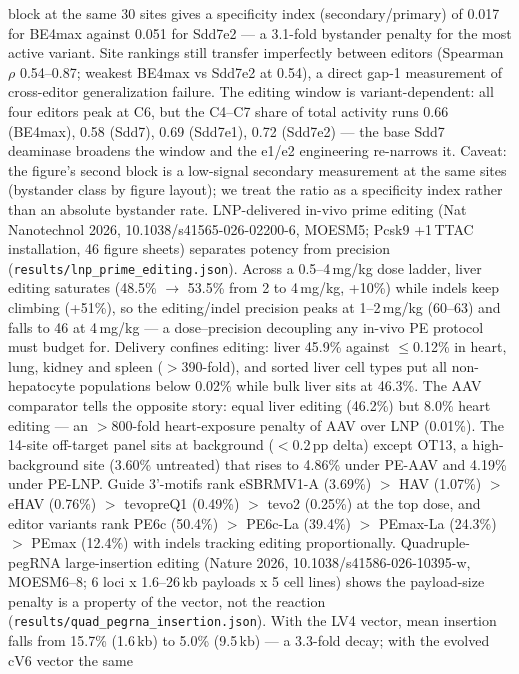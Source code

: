 \documentclass[12pt]{article}
\begin{document}
block at the same 30 sites gives a specificity index
(secondary/primary) of 0.017 for BE4max against 0.051 for Sdd7e2 ---
a 3.1-fold bystander penalty for the most active variant.
Site rankings still transfer imperfectly between editors (Spearman
$\rho$ 0.54--0.87; weakest BE4max vs Sdd7e2 at 0.54), a direct gap-1
measurement of cross-editor generalization failure. The editing window
is variant-dependent: all four editors peak at C6, but the C4--C7 share
of total activity runs 0.66 (BE4max), 0.58 (Sdd7), 0.69 (Sdd7e1),
0.72 (Sdd7e2) --- the base Sdd7 deaminase broadens the window and the
e1/e2 engineering re-narrows it. Caveat: the figure's second block is
a low-signal secondary measurement at the same sites (bystander class
by figure layout); we treat the ratio as a specificity index rather
than an absolute bystander rate.
LNP-delivered in-vivo prime editing (Nat Nanotechnol 2026,
10.1038/s41565-026-02200-6, MOESM5; Pcsk9 +1\,TTAC installation, 46
figure sheets) separates potency from precision
(\texttt{results/lnp\_prime\_editing.json}). Across a
0.5--4\,mg/kg dose ladder, liver editing saturates (48.5\% $\to$
53.5\% from 2 to 4\,mg/kg, +10\%) while indels keep climbing
(+51\%), so the editing/indel precision peaks at 1--2\,mg/kg (60--63)
and falls to 46 at 4\,mg/kg --- a dose--precision decoupling any
in-vivo PE protocol must budget for. Delivery confines editing:
liver 45.9\% against $\leq$0.12\% in heart, lung, kidney and spleen
($>$390-fold), and sorted liver cell types put all non-hepatocyte
populations below 0.02\% while bulk liver sits at 46.3\%. The AAV
comparator tells the opposite story: equal liver editing (46.2\%) but
8.0\% heart editing --- an $>$800-fold heart-exposure penalty of AAV
over LNP (0.01\%). The 14-site off-target panel sits at background
($<$0.2\,pp delta) except OT13, a high-background site (3.60\%
untreated) that rises to 4.86\% under PE-AAV and 4.19\% under PE-LNP.
Guide 3'-motifs rank eSBRMV1-A (3.69\%) $>$ HAV (1.07\%) $>$
eHAV (0.76\%) $>$ tevopreQ1 (0.49\%) $>$ tevo2 (0.25\%) at the top
dose, and editor variants rank PE6c (50.4\%) $>$ PE6c-La (39.4\%)
$>$ PEmax-La (24.3\%) $>$ PEmax (12.4\%) with indels tracking
editing proportionally.
Quadruple-pegRNA large-insertion editing (Nature 2026,
10.1038/s41586-026-10395-w, MOESM6--8; 6 loci x 1.6--26\,kb payloads x
5 cell lines) shows the payload-size penalty is a property of the
vector, not the reaction
(\texttt{results/quad\_pegrna\_insertion.json}). With the LV4
vector, mean insertion falls from 15.7\% (1.6\,kb) to 5.0\%
(9.5\,kb) --- a 3.3-fold decay; with the evolved cV6 vector the same
\end{document}
